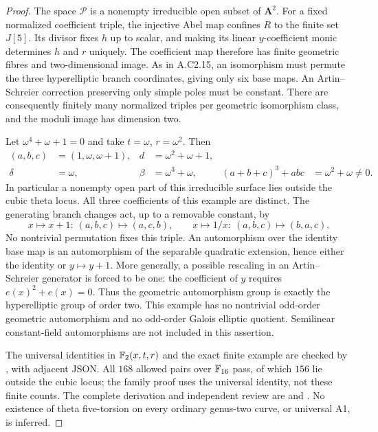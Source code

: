 \begin{proof}
The space $\mathscr P$ is a nonempty irreducible
open subset of $\mathbf A^2$.
For a fixed normalized coefficient triple, the
injective Abel map confines $R$ to the finite set
$J[5]$. Its divisor fixes $h$ up to scalar,
and making its linear $y$-coefficient monic
determines $h$ and $r$ uniquely. The coefficient
map therefore has finite geometric fibres and
two-dimensional image.
As in A.C2.15, an isomorphism must permute the
three hyperelliptic branch coordinates, giving
only six base maps. An Artin--Schreier correction
preserving only simple poles must be constant.
There are consequently finitely many normalized
triples per geometric isomorphism class, and
the moduli image has dimension two.

Let $\omega^4+\omega+1=0$ and take
$t=\omega$, $r=\omega^2$.
Then
\[
 \begin{aligned}
 (a,b,c)&=(1,\omega,\omega+1),&
 d&=\omega^2+\omega+1,\\
 \delta&=\omega,&\beta&=\omega^3+\omega,&
 (a+b+c)^3+abc&=\omega^2+\omega\ne0 .
 \end{aligned}
\]
In particular a nonempty open part of this irreducible
surface lies outside the cubic theta locus.
All three coefficients of this example are distinct.
The generating branch changes act, up to a removable
constant, by
\[
 x\mapsto x+1:\ (a,b,c)\mapsto(a,c,b),\qquad
 x\mapsto1/x:\ (a,b,c)\mapsto(b,a,c).
\]
No nontrivial permutation fixes this triple.
An automorphism over the identity base map is an
automorphism of the separable quadratic extension,
hence either the identity or $y\mapsto y+1$.
More generally, a possible rescaling in an
Artin--Schreier generator is forced to be one:
the coefficient of $y$ requires $e(x)^2+e(x)=0$.
Thus the geometric automorphism group is exactly
the hyperelliptic group of order two.
This example has no nontrivial odd-order
geometric automorphism and no odd-order Galois
elliptic quotient. Semilinear constant-field
automorphisms are not included in this assertion.

The universal identities in $\mathbb F_2(x,t,r)$ and
the exact finite example are checked by
, with
adjacent JSON. All $168$ allowed pairs over
$\mathbb F_{16}$ pass, of which $156$ lie outside the
cubic locus; the family proof uses the universal
identity, not these finite counts.
The complete derivation and independent review are
 and
.
No existence of theta five-torsion on every
ordinary genus-two curve, or universal A1,
is inferred.
\end{proof}




